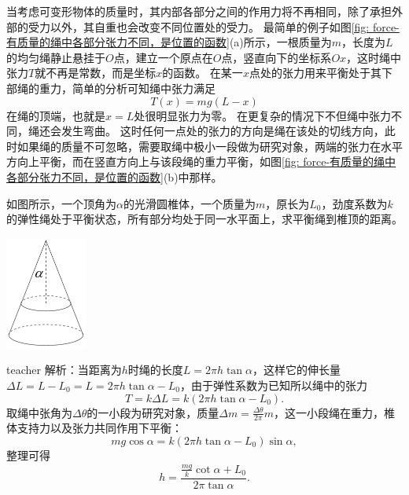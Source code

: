 当考虑可变形物体的质量时，其内部各部分之间的作用力将不再相同，除了承担外部的受力以外，其自重也会改变不同位置处的受力。
最简单的例子如图\ref{fig: force-有质量的绳中各部分张力不同，是位置的函数}(a)所示，一根质量为$m$，长度为$L$的均匀绳静止悬挂于$O$点，建立一个原点在$O$点，竖直向下的坐标系$Ox$，这时绳中张力$T$就不再是常数，而是坐标$x$的函数。
在某一$x$点处的张力用来平衡处于其下部绳的重力，简单的分析可知绳中张力满足
\[T(x) = mg(L-x)\]
在绳的顶端，也就是$x=L$处很明显张力为零。
在更复杂的情况下不但绳中张力不同，绳还会发生弯曲。
这时任何一点处的张力的方向是绳在该处的切线方向，此时如果绳的质量不可忽略，需要取绳中极小一段做为研究对象，两端的张力在水平方向上平衡，而在竖直方向上与该段绳的重力平衡，如图\ref{fig: force-有质量的绳中各部分张力不同，是位置的函数}(b)中那样。



\begin{example}
如图所示，一个顶角为$\alpha$的光滑圆椎体，一个质量为$m$，原长为$L_0$，劲度系数为$k$的弹性绳处于平衡状态，所有部分均处于同一水平面上，求平衡绳到椎顶的距离。
\begin{flushright}
\includegraphics[width = 0.2\textwidth]{images/static-force-25.pdf} 
\end{flushright}

\begin{taggedblock}{teacher}
\noindent
解析：当距离为$h$时绳的长度$L = 2\pi h\tan\alpha$，这样它的伸长量$\Delta L = L-L_0 =L = 2\pi h\tan\alpha-L_0 $，由于弹性系数为已知所以绳中的张力
\[
T = k\Delta L = k( 2\pi h\tan\alpha-L_0).
\]
取绳中张角为$\Delta\theta$的一小段为研究对象，质量$\Delta m = \frac{\Delta \theta}{2\pi}m$，这一小段绳在重力，椎体支持力以及张力共同作用下平衡：
\[
mg\cos\alpha = k( 2\pi h\tan\alpha-L_0)\sin\alpha,
\]
整理可得
\[
h = \frac{\frac{mg}{k}\cot\alpha+L_0}{2\pi\tan\alpha}.
\]
\end{taggedblock}
\end{example}

